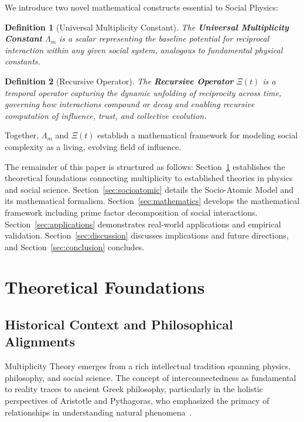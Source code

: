 \documentclass[11pt,a4paper]{article}
\newtheorem{definition}{Definition}
\begin{document}
We introduce two novel mathematical constructs essential to Social Physics:

\begin{definition}[Universal Multiplicity Constant]
The \textbf{Universal Multiplicity Constant} $\Lambda_m$ is a scalar representing the baseline potential for reciprocal interaction within any given social system, analogous to fundamental physical constants.
\end{definition}

\begin{definition}[Recursive Operator]
The \textbf{Recursive Operator} $\Xi(t)$ is a temporal operator capturing the dynamic unfolding of reciprocity across time, governing how interactions compound or decay and enabling recursive computation of influence, trust, and collective evolution.
\end{definition}

Together, $\Lambda_m$ and $\Xi(t)$ establish a mathematical framework for modeling social complexity as a living, evolving field of influence.

The remainder of this paper is structured as follows: Section~\ref{sec:foundations} establishes the theoretical foundations connecting multiplicity to established theories in physics and social science. Section~\ref{sec:socioatomic} details the Socio-Atomic Model and its mathematical formalism. Section~\ref{sec:mathematics} develops the mathematical framework including prime factor decomposition of social interactions. Section~\ref{sec:applications} demonstrates real-world applications and empirical validation. Section~\ref{sec:discussion} discusses implications and future directions, and Section~\ref{sec:conclusion} concludes.

\section{Theoretical Foundations}
\label{sec:foundations}

\subsection{Historical Context and Philosophical Alignments}

Multiplicity Theory emerges from a rich intellectual tradition spanning physics, philosophy, and social science. The concept of interconnectedness as fundamental to reality traces to ancient Greek philosophy, particularly in the holistic perspectives of Aristotle and Pythagoras, who emphasized the primacy of relationships in understanding natural phenomena~\cite{aristotle350bc}.
\end{document}

